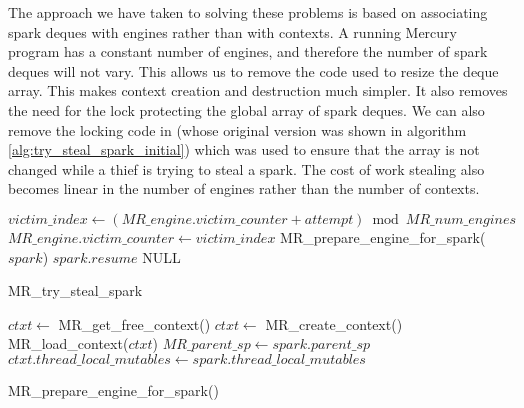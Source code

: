 The approach we have taken to solving these problems is based on associating
spark deques with engines rather than with contexts.
A running Mercury program has a constant number of engines,
and therefore the number of spark deques will not vary.
This allows us to remove the code used to resize the deque array.
This makes context creation and destruction much simpler.
It also removes the need for the lock protecting the global array of spark
deques.
We can also remove the locking code in \trystealspark
(whose original version was shown in algorithm
\ref{alg:try_steal_spark_initial})
which was used to
ensure that the array is not changed while a thief is trying to steal a
spark.
The cost of work stealing also becomes linear in the number of engines
rather than the number of contexts.

\begin{algorithm}[tbp]
\begin{algorithmic}[1]
      \State $victim\_index \gets
          (MR\_engine.victim\_counter + attempt) \bmod MR\_num\_engines$
          \Continue
      \EndIf
        \State $MR\_engine.victim\_counter \gets victim\_index$
        \State MR\_prepare\_engine\_for\_spark($spark$)
        \State \Return $spark.resume$
      \EndIf
    \EndFor
  \EndIf
  \State \Return NULL
\EndProcedure
\end{algorithmic}
\caption{MR\_try\_steal\_spark}
\label{alg:try_steal_spark_revised}
\end{algorithm}

\begin{algorithm}[tbp]
\begin{algorithmic}
        \State $ctxt \gets$ MR\_get\_free\_context()
            \State $ctxt \gets$ MR\_create\_context()
        \EndIf
        \State MR\_load\_context($ctxt$)
    \EndIf
    \State $MR\_parent\_sp \gets spark.parent\_sp$
    \State $ctxt.thread\_local\_mutables \gets
      spark.thread\_local\_mutables$
\EndProcedure
\end{algorithmic}
\caption{MR\_prepare\_engine\_for\_spark()}
\label{alg:prepare_engine_for_spark}
\end{algorithm}

